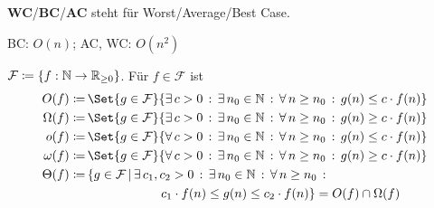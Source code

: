 \documentclass{cheat-sheet}
\begin{document}

\theoremstyle{definition}
\newtheorem*{definition}{Definition}
\newtheorem*{datenstruktur}{Datenstruktur}

\begin{abk}
  \textbf{WC}/\textbf{BC}/\textbf{AC} steht für Worst/Average/Best Case.
\end{abk}




\begin{alg}
  BC: $O(n)$; AC, WC: $O(n^2)$
\end{alg}

\begin{nota}
  $\mathcal{F} \coloneqq \{ f : \mathbb{N} \to \mathbb{R}_{\geq 0} \}$.
  Für $f \in \mathcal{F}$ ist
  \begin{align*}
         O(f) \coloneqq& \, \Set{ g \in \mathcal{F} }{ \ex{c > 0} \ex{n_0 \in \N} \fa{n \geq n_0} g(n) \leq c \cdot f(n) } \\
    \Omega(f) \coloneqq& \, \Set{ g \in \mathcal{F} }{ \ex{c > 0} \ex{n_0 \in \N} \fa{n \geq n_0} g(n) \geq c \cdot f(n) } \\
         o(f) \coloneqq& \, \Set{ g \in \mathcal{F} }{ \fa{c > 0} \ex{n_0 \in \N} \fa{n \geq n_0} g(n) \leq c \cdot f(n) } \\
    \omega(f) \coloneqq& \, \Set{ g \in \mathcal{F} }{ \fa{c > 0} \ex{n_0 \in \N} \fa{n \geq n_0} g(n) \geq c \cdot f(n) } \\
    \Theta(f) \coloneqq& \, \{ g \in \mathcal{F} \,|\, \ex{c_1, c_2 > 0} \ex{n_0 \in \N} \fa{n \geq n_0} \\
    & \qquad \qquad \qquad c_1 \cdot f(n) \leq g(n) \leq c_2 \cdot f(n) \}
              = O(f) \cap \Omega(f) \\
  \end{align*}
\end{nota}
\end{document}
